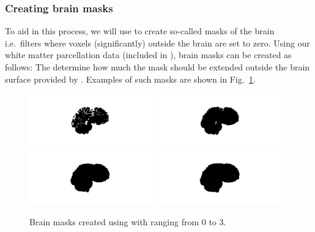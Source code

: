\subsubsection*{Creating brain masks}

To aid in this process, we will use \freesurfer{} to create so-called
masks of the brain i.e.~filters where voxels (significantly) outside
the brain are set to zero. Using our white matter parcellation data
(included in ), brain masks can be
  created as follows:
\noindent The  determine how much the mask should be
extended outside the brain surface provided by
. Examples of such masks are shown in
Fig.~\ref{fig:chp5:masks}.
\begin{figure}	
\begin{center}
  \includegraphics[trim=400 130 500 150,clip,width=0.49\textwidth]{./chapters/chp5/FIG/mask0.png}
\includegraphics[trim=400 130 500 150,clip,width=0.49\textwidth]{./chapters/chp5/FIG/mask1.png} \\
\includegraphics[trim=400 130 500 150,clip,width=0.49\textwidth]{./chapters/chp5/FIG/mask2.png}
\includegraphics[trim=400 130 500 150,clip,width=0.49\textwidth]{./chapters/chp5/FIG/mask3.png}
\end{center}
\caption{
  Brain masks created using  with  ranging from 0 to 3.
}
\label{fig:chp5:masks}
\end{figure}

